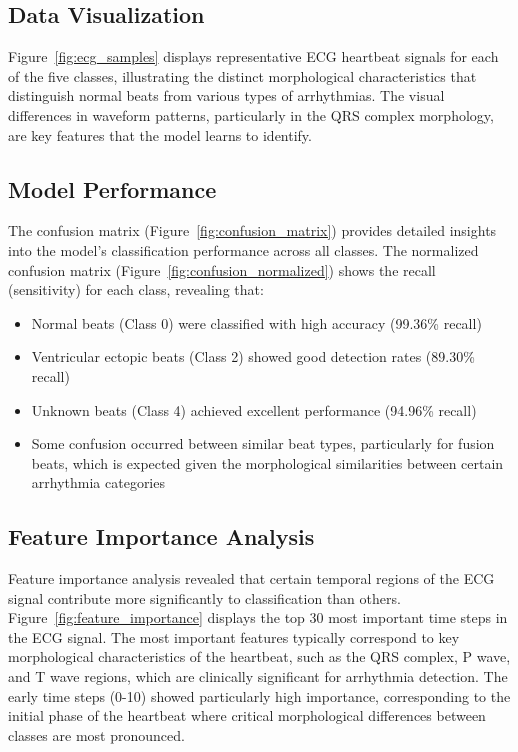 \documentclass[conference]{IEEEtran}
\begin{document}
\subsection{Data Visualization}

Figure~\ref{fig:ecg_samples} displays representative ECG heartbeat signals for each of the five classes, illustrating the distinct morphological characteristics that distinguish normal beats from various types of arrhythmias. The visual differences in waveform patterns, particularly in the QRS complex morphology, are key features that the model learns to identify.

\subsection{Model Performance}

The confusion matrix (Figure~\ref{fig:confusion_matrix}) provides detailed insights into the model's classification performance across all classes. The normalized confusion matrix (Figure~\ref{fig:confusion_normalized}) shows the recall (sensitivity) for each class, revealing that:
\begin{itemize}
    \item Normal beats (Class 0) were classified with high accuracy (99.36\% recall)
    \item Ventricular ectopic beats (Class 2) showed good detection rates (89.30\% recall)
    \item Unknown beats (Class 4) achieved excellent performance (94.96\% recall)
    \item Some confusion occurred between similar beat types, particularly for fusion beats, which is expected given the morphological similarities between certain arrhythmia categories
\end{itemize}

\subsection{Feature Importance Analysis}

Feature importance analysis revealed that certain temporal regions of the ECG signal contribute more significantly to classification than others. Figure~\ref{fig:feature_importance} displays the top 30 most important time steps in the ECG signal. The most important features typically correspond to key morphological characteristics of the heartbeat, such as the QRS complex, P wave, and T wave regions, which are clinically significant for arrhythmia detection. The early time steps (0-10) showed particularly high importance, corresponding to the initial phase of the heartbeat where critical morphological differences between classes are most pronounced.
\end{document}
